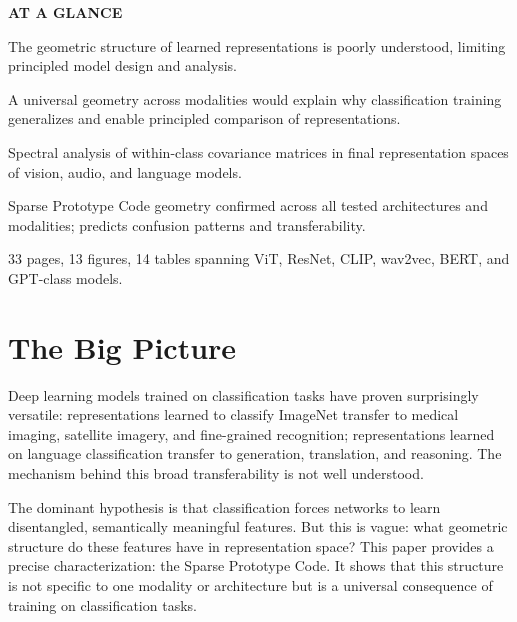 \documentclass[10pt,twocolumn]{article}
\begin{document}
\begin{mdframed}[backgroundcolor=boxgray,linecolor=rulered,linewidth=1pt,
    innerleftmargin=6pt,innerrightmargin=6pt,
    innertopmargin=6pt,innerbottommargin=6pt]
\textbf{\small AT A GLANCE}\par\vspace{4pt}
\begin{description}[leftmargin=0pt,labelsep=4pt,itemsep=2pt,parsep=0pt,
    font=\small\bfseries]
  \item[Problem:] The geometric structure of learned representations is poorly
    understood, limiting principled model design and analysis.
  \item[Why it matters:] A universal geometry across modalities would explain
    why classification training generalizes and enable principled comparison
    of representations.
  \item[Method:] Spectral analysis of within-class covariance matrices in
    final representation spaces of vision, audio, and language models.
  \item[Result:] Sparse Prototype Code geometry confirmed across all tested
    architectures and modalities; predicts confusion patterns and transferability.
  \item[Evidence:] 33 pages, 13 figures, 14 tables spanning ViT, ResNet,
    CLIP, wav2vec, BERT, and GPT-class models.
\end{description}
\end{mdframed}

\section{The Big Picture}

Deep learning models trained on classification tasks have proven surprisingly
versatile: representations learned to classify ImageNet transfer to medical imaging,
satellite imagery, and fine-grained recognition; representations learned on
language classification transfer to generation, translation, and reasoning.
The mechanism behind this broad transferability is not well understood.

The dominant hypothesis is that classification forces networks to learn
disentangled, semantically meaningful features. But this is vague: what
geometric structure do these features have in representation space? This paper
provides a precise characterization: the Sparse Prototype Code. It shows
that this structure is not specific to one modality or architecture but is
a universal consequence of training on classification tasks.
\end{document}
